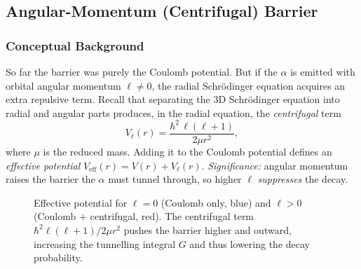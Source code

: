 
\subsection{Angular-Momentum (Centrifugal) Barrier}
\label{subsec:lec08:centrifugal}

\subsubsection*{Conceptual Background}
So far the barrier was purely the Coulomb potential.  But if the $\alpha$ is
emitted with orbital angular momentum $\ell \neq 0$, the radial Schrödinger
equation acquires an extra repulsive term.  Recall that separating the 3D
Schrödinger equation into radial and angular parts produces, in the radial
equation, the \emph{centrifugal} term
\begin{equation}
  \label{eq:lec08:centrifugal}
  \boxed{V_\ell(r) = \frac{\hbar^2\,\ell(\ell+1)}{2\mu r^2},}
\end{equation}
where $\mu$ is the reduced mass.  Adding it to the Coulomb potential defines an
\emph{effective potential} $V_\text{eff}(r) = V(r) + V_\ell(r)$.
\textit{Significance:} angular momentum raises the barrier the $\alpha$ must
tunnel through, so higher $\ell$ \emph{suppresses} the decay.

\begin{figure}[h]
\centering
{}
\caption{Effective potential for $\ell=0$ (Coulomb only, blue) and $\ell>0$
(Coulomb $+$ centrifugal, red).  The centrifugal term
$\hbar^2\ell(\ell+1)/2\mu r^2$ pushes the barrier higher and outward, increasing
the tunnelling integral $G$ and thus lowering the decay probability.}
\label{fig:lec08:centrifugal}
\end{figure}

